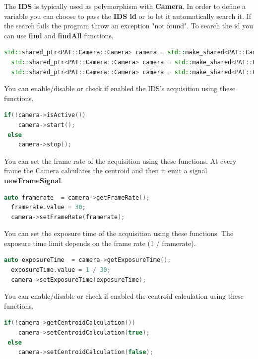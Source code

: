 The \textbf{IDS} is typically used as polymorphism with \textbf{Camera}.
In order to define a variable you can choose to pass the \textbf{IDS id}
or to let it automatically search it. If the search fails the program
throw an exception "not found". To search the id you can use
\textbf{find} and \textbf{findAll} functions.

\begin{lstlisting}[language=c++, gobble=2]
  std::shared_ptr<PAT::Camera::Camera> camera = std::make_shared<PAT::Camera::IDS>();
  std::shared_ptr<PAT::Camera::Camera> camera = std::make_shared<PAT::Camera::IDS>(IDS::find());
  std::shared_ptr<PAT::Camera::Camera> camera = std::make_shared<PAT::Camera::IDS>(IDS::findAll()->uci[0].dwCameraID);
\end{lstlisting}

You can enable/disable or check if enabled the IDS's acquisition using
these functions.

\begin{lstlisting}[language=c++, gobble=2]
  if(!camera->isActive())
    camera->start();
 else
    camera->stop();
\end{lstlisting}

You can set the frame rate of the acquisition using these functions. At
every frame the Camera calculates the centroid and then it emit a signal
\textbf{newFrameSignal}.

\begin{lstlisting}[language=c++, gobble=2]
  auto framerate  = camera->getFrameRate();
  framerate.value = 30;
  camera->setFrameRate(framerate);
\end{lstlisting}

You can set the exposure time of the acquisition using these functions.
The exposure time limit depends on the frame rate (1 / framerate).

\begin{lstlisting}[language=c++, gobble=2]
  auto exposureTime  = camera->getExposureTime();
  exposureTime.value = 1 / 30;
  camera->setExposureTime(exposureTime);
\end{lstlisting}

You can enable/disable or check if enabled the centroid calculation
using these functions.

\begin{lstlisting}[language=c++, gobble=2]
  if(!camera->getCentroidCalculation())
    camera->setCentroidCalculation(true);
 else
    camera->setCentroidCalculation(false);
\end{lstlisting}

